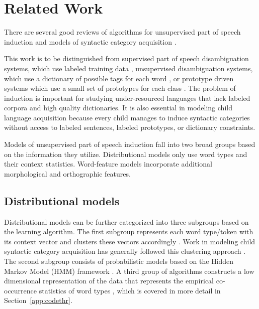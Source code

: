 \section{Related Work}
\label{sec:related}
There are several good reviews of algorithms for unsupervised
part of speech induction
\cite{Christodoulopoulos:2010:TDU:1870658.1870714,Gao:2008:CBE:1613715.1613761}
and models of syntactic category acquisition \cite{ambridge2011child}.

This work is to be distinguished from supervised part of speech
disambiguation systems, which use labeled training data
\cite{Toutanova:2003:FPT:1073445.1073478}, unsupervised disambiguation
systems, which use a dictionary of possible tags for each word
\cite{yatbaz-yuret:2010:POSTERS}, or prototype driven systems
which use a small set of prototypes for each class
\cite{Haghighi:2006:PLS:1220835.1220876}.  The problem of induction is
important for studying under-resourced languages that lack labeled
corpora and high quality dictionaries.  It is also essential in
modeling child language acquisition because every child manages to
induce syntactic categories without access to labeled sentences,
labeled prototypes, or dictionary constraints.

Models of unsupervised part of speech induction fall into two broad
groups based on the information they utilize.  Distributional models
only use word types and their context statistics.  Word-feature models
incorporate additional morphological and orthographic features.

\subsection{Distributional models}

Distributional models can be further categorized into three subgroups
based on the learning algorithm.  The first subgroup represents each
word type/token with its context vector and clusters these vectors
accordingly \cite{Schutze:1995:DPT:976973.976994}.  Work in modeling
child syntactic category acquisition has generally followed this
clustering approach
\cite{redington1998distributional,mintz2003frequent}.  The second
subgroup consists of probabilistic models based on the Hidden Markov
Model (HMM) framework \cite{Brown:1992:CNG:176313.176316}.  A third
group of algorithms constructs a low dimensional representation of the
data that represents the empirical co-occurrence statistics of word
types \cite{globerson2007euclidean}, which is covered in more detail
in Section~\ref{app:codethr}.


